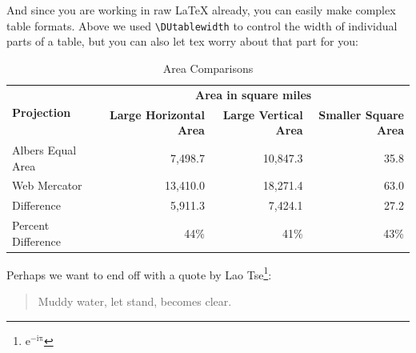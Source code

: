 And since you are working in raw LaTeX already, you can easily make complex
table formats. Above we used \verb|\DUtablewidth| to control the width of individual parts of a table, but you can also let tex worry about that part for you:

\begin{longtable}{|l|rrr|}
\caption{Area Comparisons \label{quanitities-table}}\\
\hline
\multirow{2}{*}{\bf Projection} & \multicolumn{3}{c|}{\bf Area in square miles} \\
\cline{2-4}
& \textbf{Large Horizontal Area} & \textbf{Large Vertical Area} & \textbf{Smaller Square Area} \\
\hline
\endfirsthead
Albers Equal Area & 7,498.7 & 10,847.3 & 35.8 \\
Web Mercator & 13,410.0 & 18,271.4 & 63.0 \\
Difference & 5,911.3 & 7,424.1 & 27.2 \\
Percent Difference & 44\% & 41\% & 43\% \\
\hline
\end{longtable}

Perhaps we want to end off with a quote by Lao Tse\footnote{$\mathrm{e^{-i\pi}}$}:

\begin{quote}
    Muddy water, let stand, becomes clear.
\end{quote}


